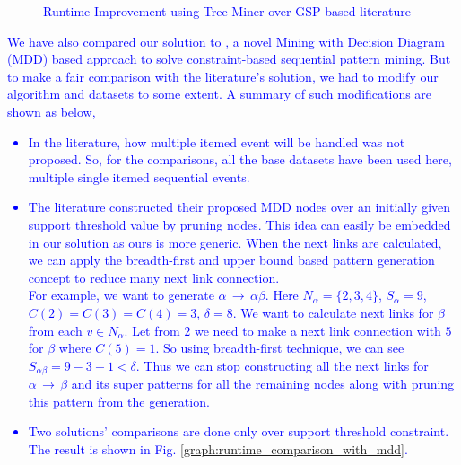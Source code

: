 \begin{figure}[!tb]
\begin{subfigure}{.24\linewidth}
\begin{adjustbox}{max width=\textwidth}
        \end{adjustbox}
        \caption{}
        \end{subfigure}
        \caption{\textcolor{blue}{Runtime Improvement using Tree-Miner over GSP based literature}}
        \label{figure:runtime_with_gsp}
        \end{figure}

\textcolor{blue}{We have also compared our solution to \cite{hosseininasab2019constraint}, a novel Mining with Decision Diagram (MDD) based approach to solve constraint-based sequential pattern mining. But to make a fair comparison with the literature's solution, we had to modify our algorithm and datasets to some extent. A summary of such modifications are shown as below,}

\textcolor{blue}{\begin{itemize}
    \item In the literature, how multiple itemed event will be handled was not proposed. So, for the comparisons, all the base datasets have been used here, multiple single itemed  sequential events.
    \item The literature constructed their proposed MDD nodes over an initially given support threshold value by pruning nodes. This idea can easily be embedded in our solution as ours is more generic. When the next links are calculated, we can apply the breadth-first and upper bound based pattern generation concept to reduce many next link connection.\\
    For example, we want to generate $\alpha \,\to\, \alpha\beta$. Here $N_{\alpha}=\{2, 3, 4\}$, $S_{\alpha}=9$, $C(2)=C(3)=C(4)=3$, $\delta=8$. We want to calculate next links for $\beta$ from each $v\in N_{\alpha}$. Let from $2$ we need to make a next link connection with $5$ for $\beta$ where $C(5)=1$. So using breadth-first technique, we can see $S_{\alpha\beta}=9-3+1<\delta$. Thus we can stop constructing all the next links for $\alpha \,\to \, \beta$ and its super patterns for all the remaining nodes along with pruning this pattern from the generation.
    \item Two solutions' comparisons are done only over support threshold constraint. The result is shown in Fig. \ref{graph:runtime_comparison_with_mdd}.
\end{itemize}}

